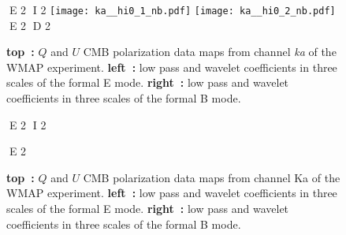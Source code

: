 \begin{figure*}
{{{E 2
I 2
\texttt{[image: ka\_\_hi0\_1\_nb.pdf]}
\texttt{[image: ka\_\_hi0\_2\_nb.pdf]}
E 2
}
}
}
D 2
\caption{\textbf{top~:} $Q$ and $U$ CMB polarization data maps from channel \emph{ka} of the WMAP experiment. \textbf{left~:} low pass and wavelet coefficients in three scales of the formal E mode. \textbf{right~:} low pass and wavelet coefficients in three scales of the formal B mode.}
E 2
I 2
\caption{\textbf{top~:} $Q$ and $U$ CMB polarization data maps from channel Ka of the WMAP experiment. \textbf{left~:} low pass and wavelet coefficients in three scales of the formal E mode. \textbf{right~:} low pass and wavelet coefficients in three scales of the formal B mode.}
E 2
\label{fig:UWTSpol}
\end{figure*}

